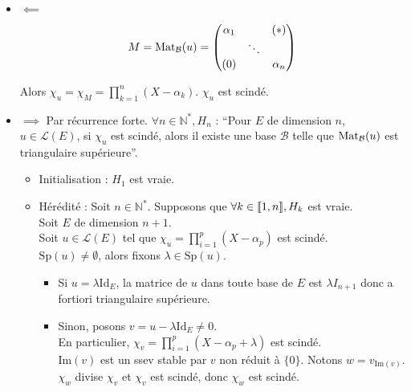 \documentclass[]{article}
\begin{document}
\begin{itemize}
    \item $\boxed{\impliedby}$
    \[ M = \text{Mat}_{\mathcal{B}}(u) = \begin{pmatrix}
        \alpha_1 & & (*) \\
        & \ddots & \\
        (0) & & \alpha_n
    \end{pmatrix} \]

    Alors $\chi_u = \chi_M = \prod_{k=1}^{n}(X - \alpha_k)$. $\chi_u$ est scindé. 
    
    \item $\boxed{\implies}$
    Par récurrence forte. $\forall n \in \mathbb{N}^*, H_n$ : ``Pour $E$ de dimension $n$, $u \in \mathcal{L}(E)$, si $\chi_u$ est scindé, alors il existe une base $\mathcal{B}$ telle que $\text{Mat}_{\mathcal{B}}(u)$ est triangulaire supérieure''. 

    \begin{itemize}
        \item Initialisation : $H_1$ est vraie. 
        \item Hérédité : Soit $n \in \mathbb{N}^*$. Supposons que $\forall k \in \llbracket {1}, {n} \rrbracket, H_k$ est vraie. \\
        
        Soit $E$ de dimension $n+1$.\\
        Soit $u \in \mathcal{L}(E)$ tel que $\chi_u = \prod_{i=1}^p (X - \alpha_p)$ est scindé. \\
        
        $\text{Sp}(u) \neq \emptyset$, alors fixons $\lambda \in \text{Sp}(u)$.

        \begin{itemize}
            \item Si $u = \lambda \text{Id}_E$, la matrice de $u$ dans toute base de $E$ est $\lambda I_{n+1}$ donc a fortiori triangulaire supérieure. 
            \item Sinon, posons $v = u - \lambda \text{Id}_E \neq 0$. \\
            
            En particulier, $\chi_v = \prod_{i=1}^p (X - \alpha_p + \lambda)$ est scindé. \\

            $\text{Im}(v)$ est un ssev stable par $v$ non réduit à $\{0\}$. Notons $w = v_{\text{Im}(v)}$. \\
            
            $\chi_w$ divise $\chi_v$ et $\chi_v$ est scindé, donc $\chi_w$ est scindé. \\


\end{itemize}
\end{itemize}
\end{itemize}
\end{document}

